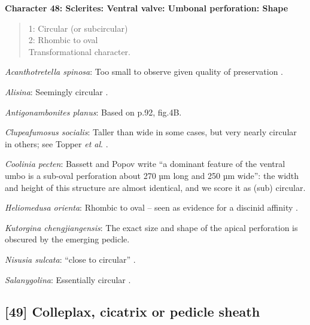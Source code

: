 \documentclass[openany]{book}
\theoremstyle{definition}
\theoremstyle{definition}
\theoremstyle{definition}
\theoremstyle{remark}
\begin{document}
\textbf{Character 48: Sclerites: Ventral valve: Umbonal perforation:
Shape}

\begin{quote}
1: Circular (or subcircular)\\
2: Rhombic to oval\\
Transformational character.
\end{quote}

\hypertarget{Acanthotretella_spinosa-coding-48}{}
\emph{Acanthotretella spinosa}: Too small to observe given quality of
preservation \citep{Holmer2006Aspinose}.

\hypertarget{Alisina-coding-48}{}
\emph{Alisina}: Seemingly circular \citep{Zhang2011Anobolellate}.

\hypertarget{Antigonambonites_planus-coding-48}{}
\emph{Antigonambonites planus}: Based on p.92, fig.4B.

\hypertarget{Clupeafumosus_socialis-coding-48}{}
\emph{Clupeafumosus socialis}: Taller than wide in some cases, but very
nearly circular in others; see Topper \emph{et al}.
\citeyearpar{Topper2013Reappraisalof}.

\hypertarget{Coolinia_pecten-coding-48}{}
\emph{Coolinia pecten}: Bassett and Popov write ``a dominant feature of
the ventral umbo is a sub-oval perforation about 270 µm long and 250 µm
wide'': the width and height of this structure are almost identical, and
we score it as (sub) circular.

\hypertarget{Heliomedusa_orienta-coding-48}{}
\emph{Heliomedusa orienta}: Rhombic to oval -- seen as evidence for a
discinid affinity \citep{Chen2007Reinterpretationof}.

\hypertarget{Kutorgina_chengjiangensis-coding-48}{}
\emph{Kutorgina chengjiangensis}: The exact size and shape of the apical
perforation is obscured by the emerging pedicle.

\hypertarget{Nisusia_sulcata-coding-48}{}
\emph{Nisusia sulcata}: ``close to circular''
\citep{Holmer2018Evolutionarysignificance}.

\hypertarget{Salanygolina-coding-48}{}
\emph{Salanygolina}: Essentially circular \citep[fig.
4]{Holmer2009Theenigmatic}.

\subsection*{{[}49{]} Colleplax, cicatrix or pedicle
sheath}\label{colleplax-cicatrix-or-pedicle-sheath}
\end{document}
